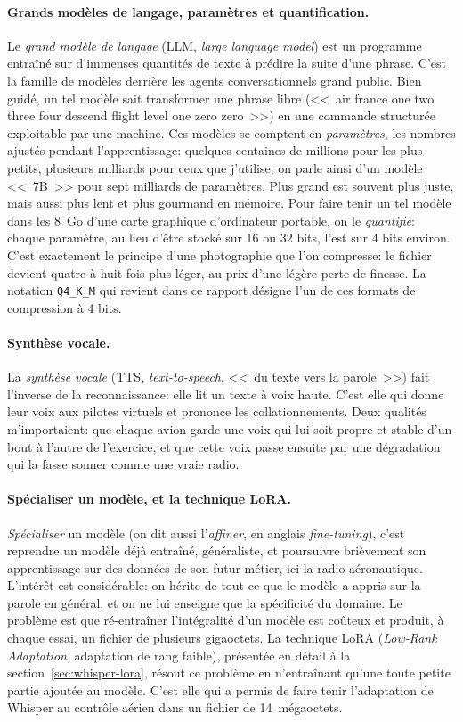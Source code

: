 \documentclass[11pt,a4paper]{article}
\begin{document}
\paragraph{Grands modèles de langage, paramètres et quantification.} Le \emph{grand modèle de langage} (LLM, \emph{large language model}) est un programme entraîné sur d'immenses quantités de texte à prédire la suite d'une phrase. C'est la famille de modèles derrière les agents conversationnels grand public. Bien guidé, un tel modèle sait transformer une phrase libre (<<~air france one two three four descend flight level one zero zero~>>) en une commande structurée exploitable par une machine. Ces modèles se comptent en \emph{paramètres}, les nombres ajustés pendant l'apprentissage: quelques centaines de millions pour les plus petits, plusieurs milliards pour ceux que j'utilise; on parle ainsi d'un modèle <<~7B~>> pour sept milliards de paramètres. Plus grand est souvent plus juste, mais aussi plus lent et plus gourmand en mémoire. Pour faire tenir un tel modèle dans les 8~Go d'une carte graphique d'ordinateur portable, on le \emph{quantifie}: chaque paramètre, au lieu d'être stocké sur 16 ou 32 bits, l'est sur 4 bits environ. C'est exactement le principe d'une photographie que l'on compresse: le fichier devient quatre à huit fois plus léger, au prix d'une légère perte de finesse. La notation \texttt{Q4\_K\_M} qui revient dans ce rapport désigne l'un de ces formats de compression à 4 bits.

\paragraph{Synthèse vocale.} La \emph{synthèse vocale} (TTS, \emph{text-to-speech}, <<~du texte vers la parole~>>) fait l'inverse de la reconnaissance: elle lit un texte à voix haute. C'est elle qui donne leur voix aux pilotes virtuels et prononce les collationnements. Deux qualités m'importaient: que chaque avion garde une voix qui lui soit propre et stable d'un bout à l'autre de l'exercice, et que cette voix passe ensuite par une dégradation qui la fasse sonner comme une vraie radio.

\paragraph{Spécialiser un modèle, et la technique LoRA.} \emph{Spécialiser} un modèle (on dit aussi l'\emph{affiner}, en anglais \emph{fine-tuning}), c'est reprendre un modèle déjà entraîné, généraliste, et poursuivre brièvement son apprentissage sur des données de son futur métier, ici la radio aéronautique. L'intérêt est considérable: on hérite de tout ce que le modèle a appris sur la parole en général, et on ne lui enseigne que la spécificité du domaine. Le problème est que ré-entraîner l'intégralité d'un modèle est coûteux et produit, à chaque essai, un fichier de plusieurs gigaoctets. La technique LoRA (\emph{Low-Rank Adaptation}, adaptation de rang faible), présentée en détail à la section~\ref{sec:whisper-lora}, résout ce problème en n'entraînant qu'une toute petite partie ajoutée au modèle. C'est elle qui a permis de faire tenir l'adaptation de Whisper au contrôle aérien dans un fichier de 14~mégaoctets. 
\end{document}
